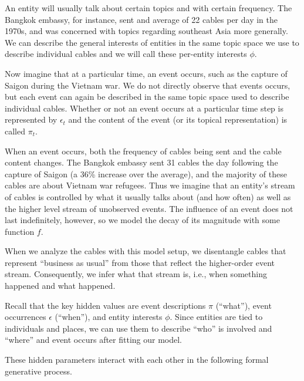 An entity will usually talk about certain topics and with certain frequency. The Bangkok embassy, for instance, sent and average of 22 cables per day in the 1970s, and was concerned with topics regarding southeast Asia more generally.  We can describe the general interests of entities in the same topic space we use to describe individual cables and we will call these per-entity interests $\phi$.

Now imagine that at a particular time, an event occurs, such as the capture of Saigon during the Vietnam war.  We do not directly observe that events occurs, but each event can again be described in the same topic space used to describe individual cables.  Whether or not an event occurs at a particular time step is represented by $\epsilon_t$ and the content of the event (or its topical representation) is called $\pi_t$.

When an event occurs, both the frequency of cables being sent and the cable content changes. The Bangkok embassy sent 31 cables the day following the capture of Saigon (a 36\% increase over the average), and the majority of these cables are about Vietnam war refugees.  Thus we imagine that an entity's stream of cables is controlled by what it usually talks about (and how often) as well as the higher level stream of unobserved events.  The influence of an event does not last indefinitely, however, so we model the decay of its magnitude with some function $f$.

When we analyze the cables with this model setup, we disentangle cables that represent ``business as usual'' from those that reflect the higher-order event stream.  Consequently, we infer what that stream is,
i.e., when something happened and what happened.

Recall that the key hidden values are event descriptions $\pi$ (``what''), event occurrences $\epsilon$ (``when''), and entity interests $\phi$.  Since entities are tied to individuals and places, we can use them to describe ``who'' is involved and ``where'' and event occurs after fitting our model.

These hidden parameters interact with each other in the following formal generative process.

